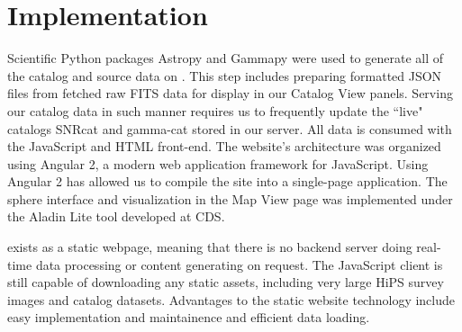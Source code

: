 \section{Implementation}

Scientific Python packages Astropy \cite{astropy} and Gammapy were used to generate all of the catalog and source data on \gammasky. This step includes preparing formatted JSON files from fetched raw FITS data for display in our Catalog View panels. Serving our catalog data in such manner requires us to frequently update the ``live" catalogs SNRcat and gamma-cat stored in our server. All data is consumed with the JavaScript and HTML front-end. The website's architecture was organized using Angular 2, a modern web application framework for JavaScript. Using Angular 2 has allowed us to compile the site into a single-page application. The sphere interface and visualization in the Map View page was implemented under the Aladin Lite tool \cite{aladin-lite} developed at CDS.


\gammasky exists as a static webpage, meaning that there is no backend server doing real-time data processing or content generating on request. The JavaScript client is still capable of downloading any static assets, including very large HiPS survey images and catalog datasets. Advantages to the static website technology include easy implementation and maintainence and efficient data loading.
